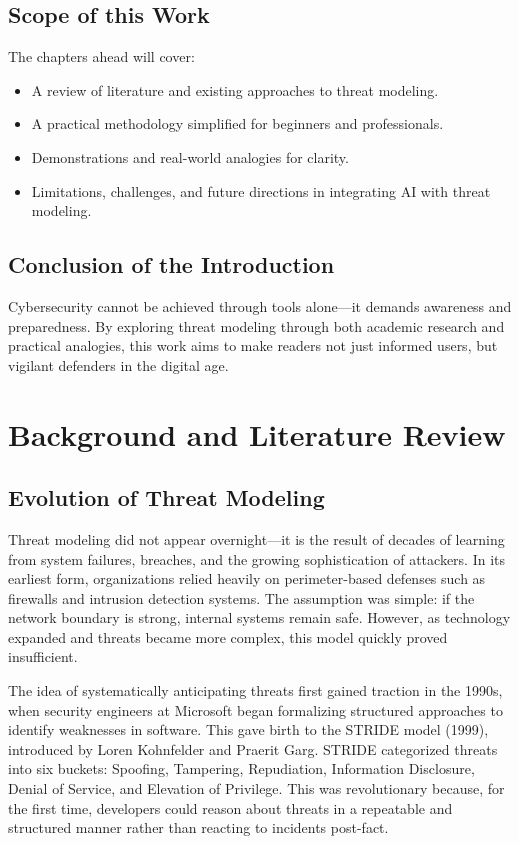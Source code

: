 \documentclass{article}
\begin{document}
\subsection{Scope of this Work}
The chapters ahead will cover:
\begin{itemize}
    \item A review of literature and existing approaches to threat modeling.
    \item A practical methodology simplified for beginners and professionals.
    \item Demonstrations and real-world analogies for clarity. 
    \item Limitations, challenges, and future directions in integrating AI with threat modeling.
\end{itemize}

\subsection{Conclusion of the Introduction}
Cybersecurity cannot be achieved through tools alone—it demands awareness and preparedness. By exploring threat modeling through both academic research and practical analogies, this work aims to make readers not just informed users, but vigilant defenders in the digital age.
\section{Background and Literature Review}
\subsection{Evolution of Threat Modeling}
Threat modeling did not appear overnight—it is the result of decades of learning from system failures, breaches, and the growing sophistication of attackers. In its earliest form, organizations relied heavily on perimeter-based defenses such as firewalls and intrusion detection systems. The assumption was simple: if the network boundary is strong, internal systems remain safe. However, as technology expanded and threats became more complex, this model quickly proved insufficient.

The idea of systematically anticipating threats first gained traction in the 1990s, when security engineers at Microsoft began formalizing structured approaches to identify weaknesses in software. This gave birth to the STRIDE model (1999), introduced by Loren Kohnfelder and Praerit Garg. STRIDE categorized threats into six buckets: Spoofing, Tampering, Repudiation, Information Disclosure, Denial of Service, and Elevation of Privilege. This was revolutionary because, for the first time, developers could reason about threats in a repeatable and structured manner rather than reacting to incidents post-fact.
\end{document}

